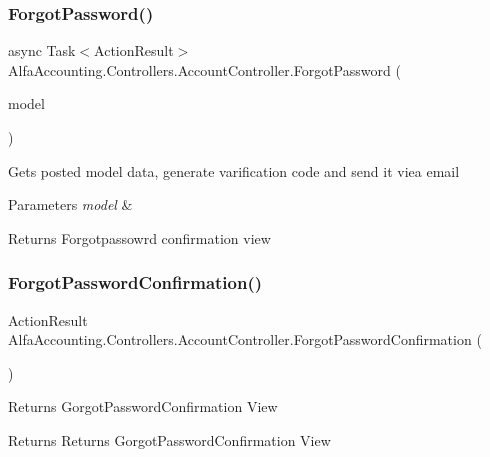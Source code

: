 \subsubsection{\texorpdfstring{Forgot\+Password()}{ForgotPassword()}\hspace{0.1cm}{\footnotesize\ttfamily [2/2]}}
{\footnotesize\ttfamily async Task$<$Action\+Result$>$ Alfa\+Accounting.\+Controllers.\+Account\+Controller.\+Forgot\+Password (\begin{DoxyParamCaption}\item[{Forgot\+Password\+View\+Model}]{model }\end{DoxyParamCaption})}



Gets posted model data, generate varification code and send it viea email 


\begin{DoxyParams}{Parameters}
{\em model} & \\
\hline
\end{DoxyParams}
\begin{DoxyReturn}{Returns}
Forgotpassowrd confirmation view
\end{DoxyReturn}
\mbox{\label{class_alfa_accounting_1_1_controllers_1_1_account_controller_a42199ed23564186b3277f4c030cb4976}} 
\subsubsection{\texorpdfstring{Forgot\+Password\+Confirmation()}{ForgotPasswordConfirmation()}}
{\footnotesize\ttfamily Action\+Result Alfa\+Accounting.\+Controllers.\+Account\+Controller.\+Forgot\+Password\+Confirmation (\begin{DoxyParamCaption}{ }\end{DoxyParamCaption})}



Returns Gorgot\+Password\+Confirmation View 

\begin{DoxyReturn}{Returns}
Returns Gorgot\+Password\+Confirmation View
\end{DoxyReturn}
\mbox{\label{class_alfa_accounting_1_1_controllers_1_1_account_controller_a56dad7128774d78fc1679f133f9dacaa}} 
